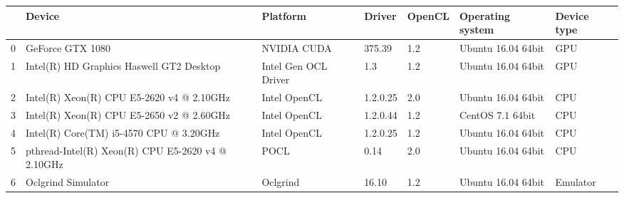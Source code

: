 \begin{tabular}{lllllll}
\toprule
{} &                                             Device &              Platform &    Driver & OpenCL &    Operating system & Device type \\
\midrule
0 &                                   GeForce GTX 1080 &           NVIDIA CUDA &    375.39 &    1.2 &  Ubuntu 16.04 64bit &         GPU \\
1 &           Intel(R) HD Graphics Haswell GT2 Desktop &  Intel Gen OCL Driver &       1.3 &    1.2 &  Ubuntu 16.04 64bit &         GPU \\
2 &          Intel(R) Xeon(R) CPU E5-2620 v4 @ 2.10GHz &          Intel OpenCL &  1.2.0.25 &    2.0 &  Ubuntu 16.04 64bit &         CPU \\
3 &          Intel(R) Xeon(R) CPU E5-2650 v2 @ 2.60GHz &          Intel OpenCL &  1.2.0.44 &    1.2 &    CentOS 7.1 64bit &         CPU \\
4 &            Intel(R) Core(TM) i5-4570 CPU @ 3.20GHz &          Intel OpenCL &  1.2.0.25 &    1.2 &  Ubuntu 16.04 64bit &         CPU \\
5 &  pthread-Intel(R) Xeon(R) CPU E5-2620 v4 @ 2.10GHz &                  POCL &      0.14 &    2.0 &  Ubuntu 16.04 64bit &         CPU \\
6 &                                 Oclgrind Simulator &              Oclgrind &     16.10 &    1.2 &  Ubuntu 16.04 64bit &    Emulator \\
\bottomrule
\end{tabular}
